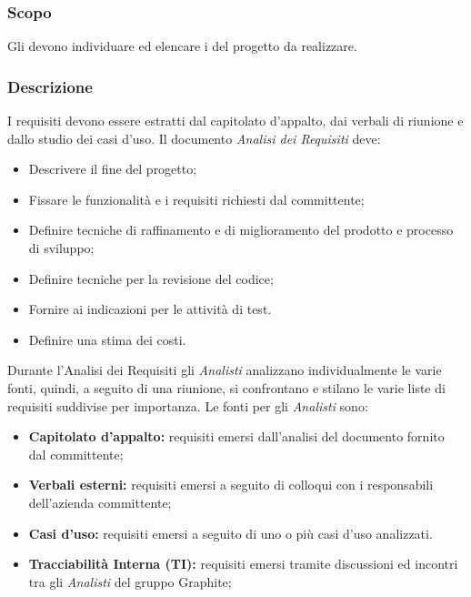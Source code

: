 \documentclass[../NomeDocumento.tex]{subfiles}
\begin{document}
	\subsubsection{Scopo} 
	
	Gli  devono individuare ed elencare i  del progetto da realizzare.
	
	\subsubsection{Descrizione}
	
	I requisiti devono essere estratti dal capitolato d’appalto, dai verbali di riunione e dallo studio dei casi d’uso. Il documento \textit{Analisi dei Requisiti} deve:
	
	\begin{itemize}
		\item Descrivere il fine del progetto;
		\item Fissare le funzionalità e i requisiti richiesti dal committente;
		\item Definire tecniche di raffinamento e di miglioramento del prodotto e processo di sviluppo;
		\item Definire tecniche per la revisione del codice;
		\item Fornire ai  indicazioni per le attività di test.
		\item Definire una stima dei costi.
	\end{itemize}

	\noindent Durante l’Analisi dei Requisiti gli \textit{Analisti} analizzano individualmente le varie fonti, quindi, a seguito di una riunione, si confrontano e stilano le varie liste di requisiti suddivise per importanza. Le fonti per gli \textit{Analisti} sono:
	 
	\begin{itemize}
		\item \textbf{Capitolato d’appalto:} requisiti emersi dall’analisi del documento fornito dal committente;
		\item \textbf{Verbali esterni:} requisiti emersi a seguito di colloqui con i responsabili dell’azienda committente;
		\item \textbf{Casi d'uso:} requisiti emersi a seguito di uno o più casi d’uso analizzati.
		\item \textbf{Tracciabilità Interna (TI):} requisiti emersi tramite discussioni ed incontri tra gli \textit{Analisti} del gruppo Graphite;
	\end{itemize}
\end{document}
